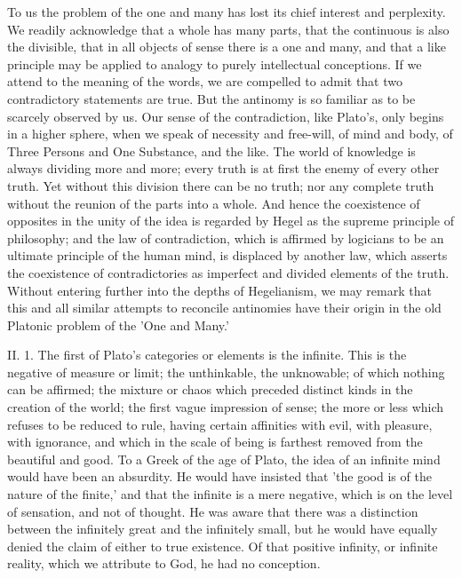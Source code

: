 \documentclass[11pt,letter]{article}
\begin{document}
\par  To us the problem of the one and many has lost its chief interest and perplexity. We readily acknowledge that a whole has many parts, that the continuous is also the divisible, that in all objects of sense there is a one and many, and that a like principle may be applied to analogy to purely intellectual conceptions. If we attend to the meaning of the words, we are compelled to admit that two contradictory statements are true. But the antinomy is so familiar as to be scarcely observed by us. Our sense of the contradiction, like Plato's, only begins in a higher sphere, when we speak of necessity and free-will, of mind and body, of Three Persons and One Substance, and the like. The world of knowledge is always dividing more and more; every truth is at first the enemy of every other truth. Yet without this division there can be no truth; nor any complete truth without the reunion of the parts into a whole. And hence the coexistence of opposites in the unity of the idea is regarded by Hegel as the supreme principle of philosophy; and the law of contradiction, which is affirmed by logicians to be an ultimate principle of the human mind, is displaced by another law, which asserts the coexistence of contradictories as imperfect and divided elements of the truth. Without entering further into the depths of Hegelianism, we may remark that this and all similar attempts to reconcile antinomies have their origin in the old Platonic problem of the 'One and Many.'

\par  II. 1. The first of Plato's categories or elements is the infinite. This is the negative of measure or limit; the unthinkable, the unknowable; of which nothing can be affirmed; the mixture or chaos which preceded distinct kinds in the creation of the world; the first vague impression of sense; the more or less which refuses to be reduced to rule, having certain affinities with evil, with pleasure, with ignorance, and which in the scale of being is farthest removed from the beautiful and good. To a Greek of the age of Plato, the idea of an infinite mind would have been an absurdity. He would have insisted that 'the good is of the nature of the finite,' and that the infinite is a mere negative, which is on the level of sensation, and not of thought. He was aware that there was a distinction between the infinitely great and the infinitely small, but he would have equally denied the claim of either to true existence. Of that positive infinity, or infinite reality, which we attribute to God, he had no conception.
\end{document}
